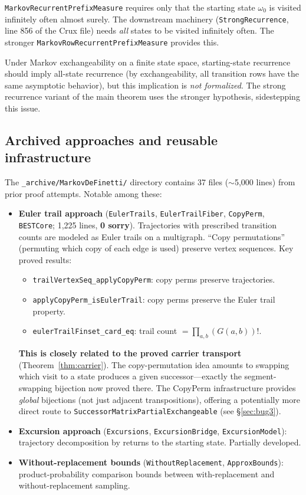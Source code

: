 \documentclass[11pt]{article}
\theoremstyle{definition}
\newcommand{\lean}[1]{\texttt{#1}}
\begin{document}
\lean{MarkovRecurrentPrefixMeasure} requires only that the starting
state $\omega_0$ is visited infinitely often almost surely.  The
downstream machinery (\lean{StrongRecurrence}, line 856 of the Crux
file) needs \emph{all} states to be visited infinitely often.  The
stronger \lean{MarkovRowRecurrentPrefixMeasure} provides this.

Under Markov exchangeability on a finite state space, starting-state
recurrence should imply all-state recurrence (by exchangeability,
all transition rows have the same asymptotic behavior), but this
implication is \emph{not formalized}.  The strong recurrence variant
of the main theorem uses the stronger hypothesis, sidestepping this
issue.

\subsection{Archived approaches and reusable infrastructure}
\label{sec:archive}

The \texttt{\_archive/MarkovDeFinetti/} directory contains 37 files
($\sim$5{,}000 lines) from prior proof attempts.  Notable among these:

\begin{itemize}[leftmargin=2em]
\item \textbf{Euler trail approach} (\lean{EulerTrails}, \lean{EulerTrailFiber},
  \lean{CopyPerm}, \lean{BESTCore}; 1{,}225 lines, \textbf{0 sorry}).
  Trajectories with prescribed transition counts are modeled as Euler
  trails on a multigraph.  ``Copy permutations'' (permuting which copy
  of each edge is used) preserve vertex sequences.  Key proved results:
  \begin{itemize}
  \item \lean{trailVertexSeq\_applyCopyPerm}: copy perms preserve trajectories.
  \item \lean{applyCopyPerm\_isEulerTrail}: copy perms preserve the Euler trail property.
  \item \lean{eulerTrailFinset\_card\_eq}: trail count $= \prod_{a,b} (G(a,b))!$.
  \end{itemize}
  \textbf{This is closely related to the proved carrier transport}
  (Theorem~\ref{thm:carrier}).  The copy-permutation idea
  amounts to swapping which visit to a state produces a given
  successor---exactly the segment-swapping bijection now proved there.
  The CopyPerm infrastructure provides \emph{global} bijections
  (not just adjacent transpositions), offering a potentially more
  direct route to \lean{SuccessorMatrixPartialExchangeable}
  (see \S\ref{sec:bug3}).

\item \textbf{Excursion approach} (\lean{Excursions}, \lean{ExcursionBridge},
  \lean{ExcursionModel}): trajectory decomposition by returns to the
  starting state.  Partially developed.

\item \textbf{Without-replacement bounds} (\lean{WithoutReplacement},
  \lean{ApproxBounds}): product-probability comparison bounds between
  with-replacement and without-replacement sampling.
\end{itemize}
\end{document}
